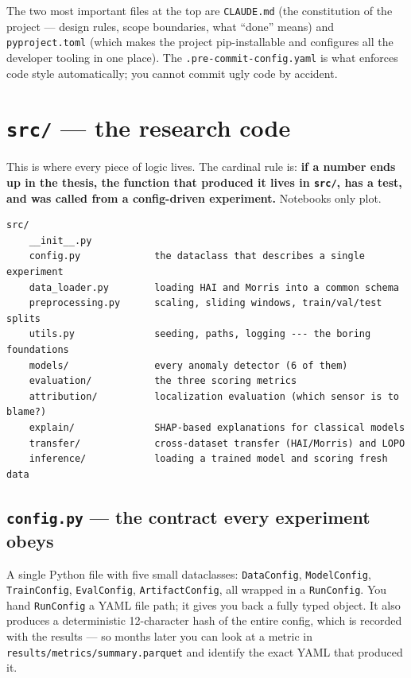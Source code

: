 \documentclass[11pt,a4paper]{article}
\newcommand{\code}[1]{\texttt{#1}}
\begin{document}
The two most important files at the top are \code{CLAUDE.md} (the constitution of the project --- design rules, scope boundaries, what ``done'' means) and \code{pyproject.toml} (which makes the project pip-installable and configures all the developer tooling in one place). The \code{.pre-commit-config.yaml} is what enforces code style automatically; you cannot commit ugly code by accident.

\section{\texttt{src/} --- the research code}

This is where every piece of logic lives. The cardinal rule is: \textbf{if a number ends up in the thesis, the function that produced it lives in \code{src/}, has a test, and was called from a config-driven experiment.} Notebooks only plot.

\begin{Verbatim}
src/
    __init__.py
    config.py             the dataclass that describes a single experiment
    data_loader.py        loading HAI and Morris into a common schema
    preprocessing.py      scaling, sliding windows, train/val/test splits
    utils.py              seeding, paths, logging --- the boring foundations
    models/               every anomaly detector (6 of them)
    evaluation/           the three scoring metrics
    attribution/          localization evaluation (which sensor is to blame?)
    explain/              SHAP-based explanations for classical models
    transfer/             cross-dataset transfer (HAI/Morris) and LOPO
    inference/            loading a trained model and scoring fresh data
\end{Verbatim}

\subsection{\texttt{config.py} --- the contract every experiment obeys}

A single Python file with five small dataclasses: \code{DataConfig}, \code{ModelConfig}, \code{TrainConfig}, \code{EvalConfig}, \code{ArtifactConfig}, all wrapped in a \code{RunConfig}. You hand \code{RunConfig} a YAML file path; it gives you back a fully typed object. It also produces a deterministic 12-character hash of the entire config, which is recorded with the results --- so months later you can look at a metric in \code{results/metrics/summary.parquet} and identify the exact YAML that produced it.
\end{document}
